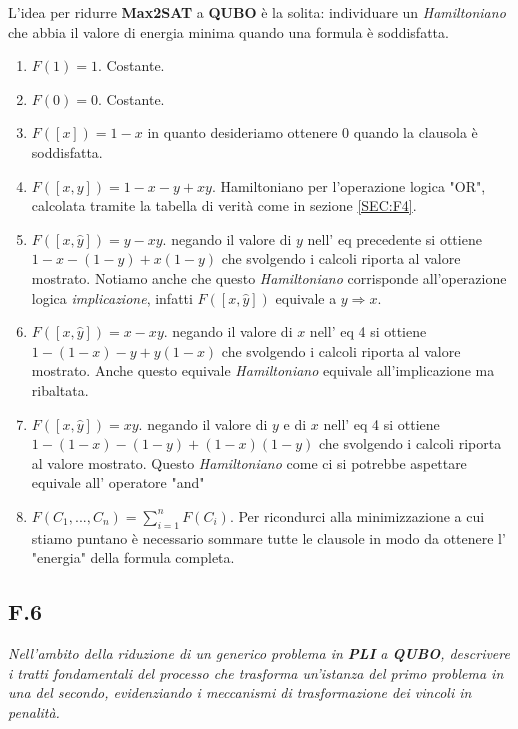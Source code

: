\documentclass[a4paper]{article}
\begin{document}
L'idea per ridurre \textbf{Max2SAT} a \textbf{QUBO} è la solita: individuare un \textit{Hamiltoniano} che abbia il valore di energia minima quando una formula è soddisfatta.
\begin{enumerate}
	\item $F(1)=1$. Costante. 
	\item $F(0)=0$. Costante. 
	\item $F([x])=1-x$ in quanto desideriamo ottenere 0 quando la clausola è soddisfatta.
	\item $F([x,y])= 1-x-y +xy$. Hamiltoniano per l'operazione logica "OR", calcolata tramite la tabella di verità come in sezione \ref{SEC:F4}.
	\item $F([x,\hat y])= y - xy$. negando il valore di $y$ nell' eq precedente si ottiene $1-x-(1-y)+x(1-y)$ che svolgendo i calcoli riporta al valore mostrato.
		Notiamo anche che questo \textit{Hamiltoniano} corrisponde all'operazione logica \textit{implicazione}, infatti $F([x,\hat y])$ equivale a $ y \Rightarrow x$.
	\item $F([x,\hat y])= x - xy$. negando il valore di $x$ nell' eq 4 si ottiene $1-(1-x)-y+y(1-x)$ che svolgendo i calcoli riporta al valore mostrato.
		Anche questo equivale \textit{Hamiltoniano} equivale all'implicazione ma ribaltata.
	\item $F([x,\hat y])= xy$. negando il valore di $y$ e di $x$ nell' eq 4 si ottiene $1-(1-x)-(1-y)+(1-x)(1-y)$ che svolgendo i calcoli riporta al valore mostrato.
		Questo \textit{Hamiltoniano} come ci si potrebbe aspettare equivale all' operatore "and"
	\item $F(C_1,...,C_n) = \sum_{i=1}^n F(C_i)$. Per ricondurci alla minimizzazione a cui stiamo puntano è necessario sommare tutte le clausole in modo da ottenere l' "energia" della formula completa.
\end{enumerate}
\subsection{F.6}
\emph{Nell’ambito della riduzione di un generico problema in \textbf{PLI} a \textbf{QUBO}, descrivere i tratti fondamentali del processo che trasforma un’istanza del primo problema in una del secondo, evidenziando i meccanismi di trasformazione dei vincoli in penalità.}
\end{document}
